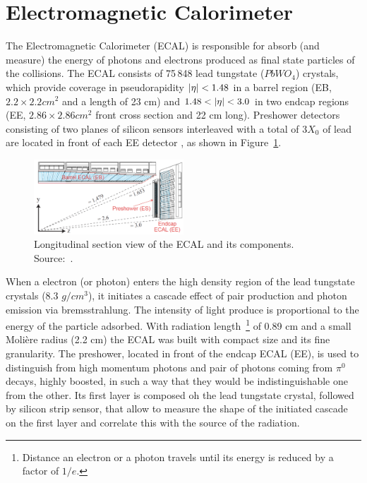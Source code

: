 
\section{Electromagnetic Calorimeter}

The Electromagnetic Calorimeter (ECAL) is responsible for absorb (and measure) the energy of photons and electrons produced as final state particles of the collisions. The ECAL consists of 75\,848 lead tungstate ($PbWO_4$) crystals, which provide coverage in pseudorapidity $\lvert \eta \rvert < 1.48 $ in a barrel region (EB, $2.2 \times 2.2 cm^2$ and a length of 23 cm) and $1.48 < \lvert \eta \rvert < 3.0$ in two endcap regions (EE, $2.86 \times 2.86 cm^2$ front cross section and 22 cm long). Preshower detectors consisting of two planes of silicon sensors interleaved with a total of $3 X_0$ of lead are located in front of each EE detector \cite{Khachatryan:2015hwa}, as shown in Figure~\ref{cms_ecal}. 

\begin{figure}[htbp]
    \centering
    \includegraphics[width=0.5\textwidth]{figures_and_tables/experimental_setup/cms_ecal.png}
    \caption{Longitudinal section view of the ECAL and its components. Source:~\cite{Chatrchyan:2008zzk}.}
    \label{cms_ecal}
\end{figure}

When a electron (or photon) enters the high density region of the lead tungstate crystals (8.3 $g/cm^3$), it initiates a cascade effect of pair production and photon emission via bremsstrahlung. The intensity of light produce is proportional to the energy of the particle adsorbed. With radiation length~\footnote{Distance an electron or a photon travels
until its energy is reduced by a factor of $1/e$.} of 0.89 cm and a small Molière radius (2.2 cm) the ECAL was built with compact size and its fine granularity. The preshower, located in front of the endcap ECAL (EE), is used to distinguish from high momentum photons and pair of photons coming from $\pi^0$ decays, highly boosted, in such a way that they would be indistinguishable one from the other. Its first layer is composed oh the lead tungstate crystal, followed by silicon strip sensor, that allow to measure the shape of the initiated cascade on the first layer and correlate this with the source of the radiation. 

